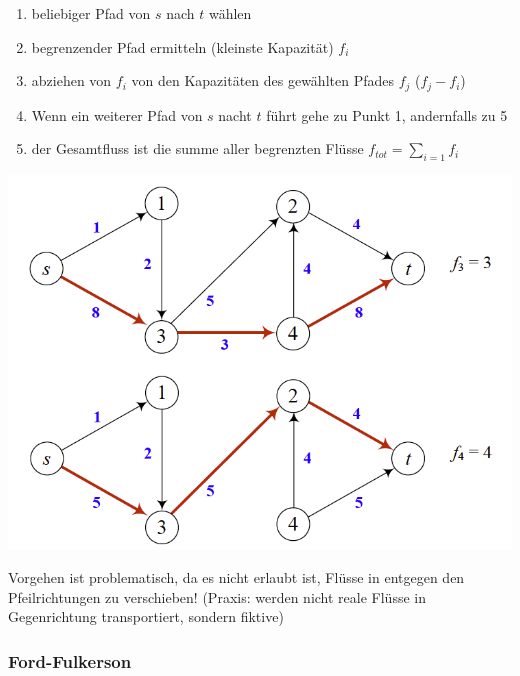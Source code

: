 \begin{minipage}{0.7\textwidth}
	\begin{enumerate}
		\item beliebiger Pfad von $s$ nach $t$ wählen
		\item begrenzender Pfad ermitteln (kleinste Kapazität) $f_i$
		\item abziehen von $f_i$ von den Kapazitäten des gewählten Pfades $f_j$ ($f_j-f_i$)
		\item Wenn ein weiterer Pfad von $s$ nacht $t$ führt gehe zu  Punkt 1, andernfalls zu 5
		\item der Gesamtfluss ist die summe aller begrenzten Flüsse $f_{tot} = \sum_{i=1} f_i$
	\end{enumerate}
\end{minipage}
\begin{minipage}{0.3\textwidth}
	\includegraphics[width=\textwidth]{Content/Graphen/augmentingPathMethode.png}
\end{minipage}


Vorgehen ist problematisch, da es nicht erlaubt ist, Flüsse in entgegen den Pfeilrichtungen zu verschieben! (Praxis: werden nicht reale Flüsse in Gegenrichtung transportiert, sondern fiktive)


\subsubsection{Ford-Fulkerson}

